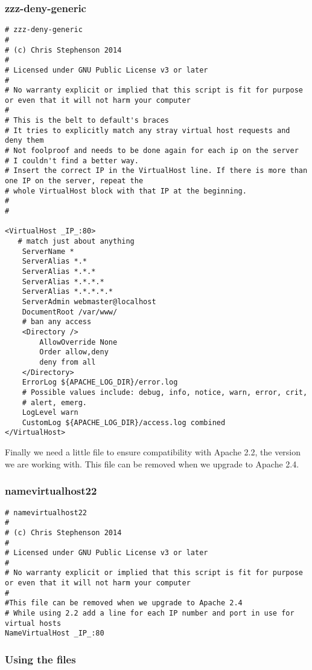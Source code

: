 \documentclass[12pt, a4paper]{article}
\begin{document}
\subsubsection*{zzz-deny-generic}
\begin{verbatim}
# zzz-deny-generic
#
# (c) Chris Stephenson 2014
#
# Licensed under GNU Public License v3 or later
#
# No warranty explicit or implied that this script is fit for purpose or even that it will not harm your computer 
#
# This is the belt to default's braces
# It tries to explicitly match any stray virtual host requests and deny them
# Not foolproof and needs to be done again for each ip on the server 
# I couldn't find a better way.
# Insert the correct IP in the VirtualHost line. If there is more than one IP on the server, repeat the 
# whole VirtualHost block with that IP at the beginning.
#
# 

<VirtualHost _IP_:80>
   # match just about anything
	ServerName *
	ServerAlias *.*
	ServerAlias *.*.*
	ServerAlias *.*.*.*
	ServerAlias *.*.*.*.*
	ServerAdmin webmaster@localhost
	DocumentRoot /var/www/
	# ban any access
	<Directory />
		AllowOverride None
		Order allow,deny
		deny from all
	</Directory>
	ErrorLog ${APACHE_LOG_DIR}/error.log
	# Possible values include: debug, info, notice, warn, error, crit,
	# alert, emerg.
	LogLevel warn
	CustomLog ${APACHE_LOG_DIR}/access.log combined
</VirtualHost>

\end{verbatim}


Finally we need a little file to ensure compatibility with Apache 2.2, the version we are working with. This file can be removed when we upgrade to Apache 2.4.

\subsubsection*{namevirtualhost22}

\begin{verbatim}
# namevirtualhost22
#
# (c) Chris Stephenson 2014
#
# Licensed under GNU Public License v3 or later
#
# No warranty explicit or implied that this script is fit for purpose or even that it will not harm your computer 
#
#This file can be removed when we upgrade to Apache 2.4
# While using 2.2 add a line for each IP number and port in use for virtual hosts 
NameVirtualHost _IP_:80

\end{verbatim}


\subsubsection*{Using the files}
\end{document}
